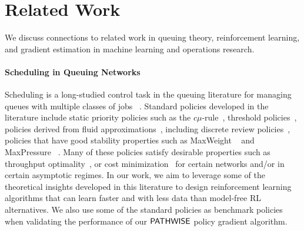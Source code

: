 \section{Related Work}
\label{section:related_work}

We discuss connections to related work in queuing theory, reinforcement learning, and gradient estimation in machine learning and operations research.

\paragraph{Scheduling in Queuing Networks}

Scheduling is a long-studied control task in the queuing literature for managing queues with multiple classes of jobs ~\cite{harrison1989scheduling, meyn2008control}. Standard policies developed in the literature include static priority policies such as the $c\mu$-rule~\cite{cox1961queues}, threshold policies~\cite{rosberg1982optimal}, policies derived from fluid approximations~\cite{avram1994optimal, chen1993dynamic, meyn2001sequencing}, including discrete review policies~\cite{harrison1996bigstep, maglaras2000discrete}, policies that have good stability properties such as MaxWeight ~\cite{stolyar2004maxweight} and MaxPressure ~\cite{dai2005maximum}. Many of these policies satisfy desirable properties such as throughput optimality~\cite{tassiulas1990stability, armony2003queueing}, or cost minimization~\cite{cox1961queues, mandelbaum2004scheduling} for certain networks and/or in certain asymptotic regimes. In our work, we aim to leverage some of the theoretical insights developed in this literature to design reinforcement learning algorithms that can learn faster and with less data than model-free RL alternatives. We also use some of the standard policies as benchmark policies when validating the performance of our $\mathsf{PATHWISE}$ policy gradient algorithm.

